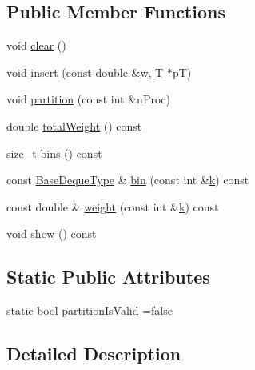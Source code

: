 \subsection*{Public Member Functions}
\begin{DoxyCompactItemize}
\item 
void \hyperlink{classmodel_1_1_l_p_tpartitioner_a1eddc9952b0bc1383ffd813fca911655}{clear} ()
\item 
void \hyperlink{classmodel_1_1_l_p_tpartitioner_a46c98c4ae6bc50825c6438ba50a131be}{insert} (const double \&\hyperlink{plot_cells_8m_aad57484016654da87125db86f4227ea3}{w}, \hyperlink{_spline_node_base__corder1_8h_a82692d3a5502b91460591f1d5504314a}{T} $\ast$p\+T)
\item 
void \hyperlink{classmodel_1_1_l_p_tpartitioner_a46985d3114fe658e0e0789ada4453fc4}{partition} (const int \&n\+Proc)
\item 
double \hyperlink{classmodel_1_1_l_p_tpartitioner_ad9a04c3c850b6aaab0ded0b3a8f58b01}{total\+Weight} () const 
\item 
size\+\_\+t \hyperlink{classmodel_1_1_l_p_tpartitioner_a61e62ad8dcac7e02e5285c3765c0b910}{bins} () const 
\item 
const \hyperlink{classmodel_1_1_l_p_tpartitioner_a29fe16f05a6fed1fb672a28379ec80c2}{Base\+Deque\+Type} \& \hyperlink{classmodel_1_1_l_p_tpartitioner_af09f84209ab5ad48280b19a4a547d413}{bin} (const int \&\hyperlink{_f_e_m_2linear__elasticity__3d_2tetgen_2generate_p_o_l_ycube_8m_a5d2aad4440da75aa43f2643e72b1a3bd}{k}) const 
\item 
const double \& \hyperlink{classmodel_1_1_l_p_tpartitioner_abeac2e966b48b519f18357d2d59ae7c2}{weight} (const int \&\hyperlink{_f_e_m_2linear__elasticity__3d_2tetgen_2generate_p_o_l_ycube_8m_a5d2aad4440da75aa43f2643e72b1a3bd}{k}) const 
\item 
void \hyperlink{classmodel_1_1_l_p_tpartitioner_a46f1ae5823e717f0eabc7aa8e8eb919c}{show} () const 
\end{DoxyCompactItemize}
\subsection*{Static Public Attributes}
\begin{DoxyCompactItemize}
\item 
static bool \hyperlink{classmodel_1_1_l_p_tpartitioner_ab333a3ca83108b9ac9294bcb836448c9}{partition\+Is\+Valid} =false
\end{DoxyCompactItemize}


\subsection{Detailed Description}
